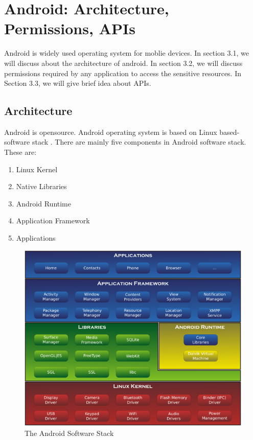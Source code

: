 \chapter{Android: Architecture, Permissions, APIs}
\label{ch:related}

\thispagestyle{empty}
Android is widely used operating system for moblie devices. In section 3.1, we will discuss about the architecture of android. In section 3.2, we will discuss permissions required by any application to access the sensitive resources. In Section 3.3, we will give brief idea about APIs.
\section{Architecture}
Android is opensource. Android operating system is based on Linux based-software stack \cite{androidplatformarch}. There are mainly five components in Android software stack. These are:
\begin{enumerate}
    \item Linux Kernel
    \item Native Libraries
    \item Android Runtime
    \item Application Framework
    \item Applications
\end{enumerate}
\begin{figure}[!h]
  \centering
  \includegraphics [scale=0.8] {and_arch.png}
  \caption{The Android Software Stack}
  \label{fig:arch}
\end{figure}
